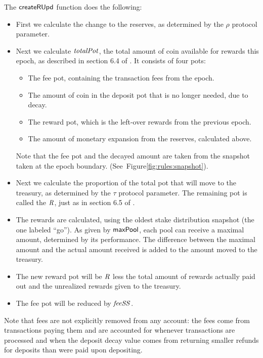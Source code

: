 The $\mathsf{createRUpd}$ function does the following:
\begin{itemize}
  \item First we calculate the change to the reserves,
    as determined by the $\rho$ protocol parameter.
  \item Next we calculate $\mathit{totalPot}$, the total amount of coin available for rewards this
    epoch, as described in section 6.4 of \cite{delegation_design}. It consists of four pots:
    \begin{itemize}
      \item The fee pot, containing the transaction fees from the epoch.
      \item The amount of coin in the deposit pot that is no longer needed, due to decay.
      \item The reward pot, which is the left-over rewards from the previous epoch.
      \item The amount of monetary expansion from the reserves, calculated above.
    \end{itemize}
    Note that the fee pot and the decayed amount are taken from the snapshot taken at the
    epoch boundary.  (See~Figure\ref{fig:rules:snapshot}).
  \item Next we calculate the proportion of the total pot that will move to the treasury,
    as determined by the $\tau$ protocol parameter. The remaining pot is called the
    $\mathit{R}$, just as in section 6.5 of \cite{delegation_design}.
  \item The rewards are calculated, using the oldest stake distribution snapshot (the one
    labeled ``go'').
    As given by $\mathsf{maxPool}$, each pool can receive a maximal amount, determined by its
    performance.  The difference between the maximal amount and the actual amount received is
    added to the amount moved to the treasury.
  \item The new reward pot will be $\mathit{R}$ less the total amount of rewards
    actually paid out and the unrealized rewards given to the treasury.
  \item The fee pot will be reduced by $\mathit{feeSS}$.
\end{itemize}

Note that fees are not explicitly removed from any account:
the fees come from transactions paying them and are accounted for whenever
transactions are processed and when the deposit decay value comes from returning
smaller refunds for deposits than were paid upon depositing.

